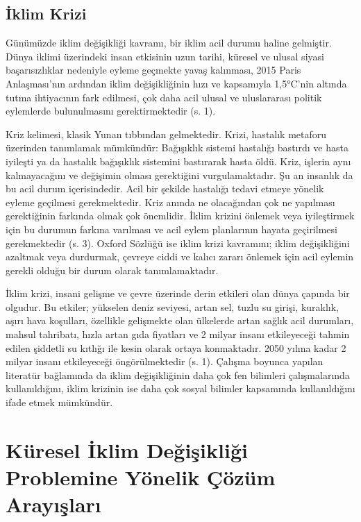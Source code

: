 \documentclass[
]{book}
\begin{document}
\hypertarget{iklim-krizi}{%
\subsection{İklim Krizi}\label{iklim-krizi}}

Günümüzde iklim değişikliği kavramı, bir iklim acil durumu haline gelmiştir. Dünya iklimi üzerindeki insan etkisinin uzun tarihi, küresel ve ulusal siyasi başarısızlıklar nedeniyle eyleme geçmekte yavaş kalınması, 2015 Paris Anlaşması'nın ardından iklim değişikliğinin hızı ve kapsamıyla 1,5°C'nin altında tutma ihtiyacının fark edilmesi, çok daha acil ulusal ve uluslararası politik eylemlerde bulunulmasını gerektirmektedir (s. 1). \citep{harvey2016climate}

Kriz kelimesi, klasik Yunan tıbbından gelmektedir. Krizi, hastalık metaforu üzerinden tanımlamak mümkündür: Bağışıklık sistemi hastalığı bastırdı ve hasta iyileşti ya da hastalık bağışıklık sistemini bastırarak hasta öldü. Kriz, işlerin aynı kalmayacağını ve değişimin olması gerektiğini vurgulamaktadır. Şu an insanlık da bu acil durum içerisindedir. Acil bir şekilde hastalığı tedavi etmeye yönelik eyleme geçilmesi gerekmektedir. Kriz anında ne olacağından çok ne yapılması gerektiğinin farkında olmak çok önemlidir. İklim krizini önlemek veya iyileştirmek için bu durumun farkına varılması ve acil eylem planlarının hayata geçirilmesi gerekmektedir (s. 3). \citep{byrne2021} Oxford Sözlüğü ise iklim krizi kavramını; iklim değişikliğini azaltmak veya durdurmak, çevreye ciddi ve kalıcı zararı önlemek için acil eylemin gerekli olduğu bir durum olarak tanımlamaktadır. \citep{oxfordlearnersdict_climatecrisis}

İklim krizi, insani gelişme ve çevre üzerinde derin etkileri olan dünya çapında bir olgudur. Bu etkiler; yükselen deniz seviyesi, artan sel, tuzlu su girişi, kuraklık, aşırı hava koşulları, özellikle gelişmekte olan ülkelerde artan sağlık acil durumları, mahsul tahribatı, hızla artan gıda fiyatları ve 2 milyar insanı etkileyeceği tahmin edilen şiddetli su kıtlığı ile kesin olarak ortaya konmaktadır. 2050 yılına kadar 2 milyar insanı etkileyeceği öngörülmektedir (s. 1). \citep{pink2018climate} Çalışma boyunca yapılan literatür bağlamında da iklim değişikliğinin daha çok fen bilimleri çalışmalarında kullanıldığını, iklim krizinin ise daha çok sosyal bilimler kapsamında kullanıldığını ifade etmek mümkündür.

\hypertarget{kuxfcresel-iklim-deux11fiux15fikliux11fi-problemine-yuxf6nelik-uxe7uxf6zuxfcm-arayux131ux15flarux131}{%
\section{Küresel İklim Değişikliği Problemine Yönelik Çözüm Arayışları}\label{kuxfcresel-iklim-deux11fiux15fikliux11fi-problemine-yuxf6nelik-uxe7uxf6zuxfcm-arayux131ux15flarux131}}
\end{document}
